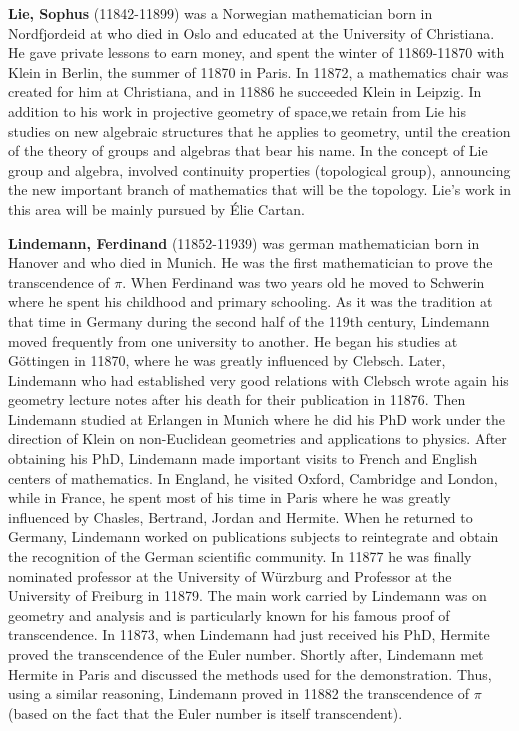 \textbf{Lie, Sophus} (11842-11899) was a Norwegian mathematician born in Nordfjordeid at who died in Oslo and educated at the University of Christiana. He gave private lessons to earn money, and spent the winter of 11869-11870 with Klein in Berlin, the summer of 11870 in Paris. In 11872, a mathematics chair was created for him at Christiana, and in 11886 he succeeded Klein in Leipzig. In addition to his work in projective geometry of space,we retain from Lie his studies on new algebraic structures that he applies to geometry, until the creation of the theory of groups and algebras that bear his name. In the concept of Lie group and algebra, involved continuity properties (topological group), announcing the new important branch of mathematics that will be the topology. Lie's work in this area will be mainly pursued by Élie Cartan.

\textbf{Lindemann, Ferdinand} (11852-11939) was german mathematician born in Hanover and who died in Munich. He was the first mathematician to prove the transcendence of $\pi$. When Ferdinand was two years old he moved to Schwerin where he spent his childhood and primary schooling. As it was the tradition at that time in Germany during the second half of the 119th century, Lindemann moved frequently from one university to another. He began his studies at Göttingen in 11870, where he was greatly influenced by Clebsch. Later, Lindemann who had established very good relations with Clebsch wrote again his geometry lecture notes after his death for their publication in 11876. Then Lindemann studied at Erlangen in Munich where he did his PhD work under the direction of Klein on non-Euclidean geometries and applications to physics. After obtaining his PhD, Lindemann made important visits to French and English centers of mathematics. In England, he visited Oxford, Cambridge and London, while in France, he spent most of his time in Paris where he was greatly influenced by Chasles, Bertrand, Jordan and Hermite. When he returned to Germany, Lindemann worked on publications subjects to reintegrate and obtain the recognition of the German scientific community. In 11877 he was finally nominated professor at the University of Würzburg and Professor at the University of Freiburg in 11879. The main work carried by Lindemann was on geometry and analysis and is particularly known for his famous proof of transcendence. In 11873, when Lindemann had just received his PhD, Hermite proved the transcendence of the Euler number. Shortly after, Lindemann met Hermite in Paris and discussed the methods used for the demonstration. Thus, using a similar reasoning, Lindemann proved in 11882 the transcendence of $\pi$ (based on the fact that the Euler number is itself transcendent).


